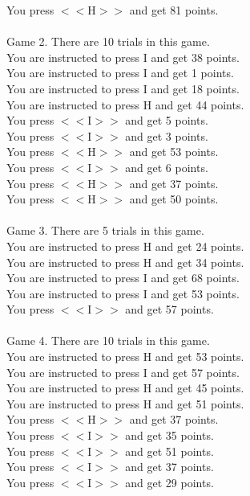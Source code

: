 \documentclass[pdflatex,sn-nature]{sn-jnl}%
\theoremstyle{thmstyleone}%
\theoremstyle{thmstyletwo}%
\theoremstyle{thmstylethree}%
\begin{document}
You press $<<$H$>>$ and get 81 points. $~$\\ 
 $~$\\ 
Game 2. There are 10 trials in this game. $~$\\ 
You are instructed to press I and get 38 points. $~$\\ 
You are instructed to press I and get 1 points. $~$\\ 
You are instructed to press I and get 18 points. $~$\\ 
You are instructed to press H and get 44 points. $~$\\ 
You press $<<$I$>>$ and get 5 points. $~$\\ 
You press $<<$I$>>$ and get 3 points. $~$\\ 
You press $<<$H$>>$ and get 53 points. $~$\\ 
You press $<<$I$>>$ and get 6 points. $~$\\ 
You press $<<$H$>>$ and get 37 points. $~$\\ 
You press $<<$H$>>$ and get 50 points. $~$\\ 
 $~$\\ 
Game 3. There are 5 trials in this game. $~$\\ 
You are instructed to press H and get 24 points. $~$\\ 
You are instructed to press H and get 34 points. $~$\\ 
You are instructed to press I and get 68 points. $~$\\ 
You are instructed to press I and get 53 points. $~$\\ 
You press $<<$I$>>$ and get 57 points. $~$\\ 
 $~$\\ 
Game 4. There are 10 trials in this game. $~$\\ 
You are instructed to press H and get 53 points. $~$\\ 
You are instructed to press I and get 57 points. $~$\\ 
You are instructed to press H and get 45 points. $~$\\ 
You are instructed to press H and get 51 points. $~$\\ 
You press $<<$H$>>$ and get 37 points. $~$\\ 
You press $<<$I$>>$ and get 35 points. $~$\\ 
You press $<<$I$>>$ and get 51 points. $~$\\ 
You press $<<$I$>>$ and get 37 points. $~$\\ 
You press $<<$I$>>$ and get 29 points. $~$\\ 
\end{document}

